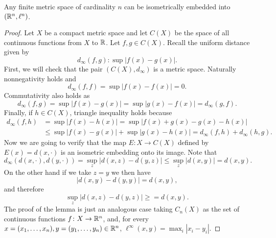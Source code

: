 \begin{lemma} \label{lemma:haus-aux-1}
    Any finite metric space of cardinality $ n $ can be isometrically embedded into $(\mathbb R^n, \ell^n)$.
\end{lemma}
\begin{proof}
    Let $ X $ be a compact metric space and let $ C(X) $ be the space of all continuous functions from $ X $ to $ \mathbb R $. Let $ f, g \in C(X) $. Recall the uniform distance given by
    \begin{equation}
        d_\infty(f, g) \colon \sup | f(x) - g(x) |.
    \end{equation}
    First, we will check that the pair $ (C(X), d_\infty) $ is a metric space. Naturally nonnegativity holds and 
    \begin{equation}
        d_\infty(f, f) = \sup | f(x) - f(x) | = 0.
    \end{equation}
    Commutativity also holds as 
    \begin{equation}
        d_\infty(f, g) = \sup | f(x) - g(x) | = \sup | g(x) - f(x) | = d_\infty(g, f).
    \end{equation}
    Finally, if $ h \in C(X) $, triangle inequality holds because
    \begin{align}
        d_\infty(f, h) &= \sup | f(x) - h(x) | = \sup | f(x) + g(x) - g(x) - h(x) | \\
        &\leq \sup | f(x)- g(x) | + \sup | g(x) - h(x) | = d_\infty(f, h) + d_\infty(h, g).
    \end{align}
    Now we are going to verify that the map $ E \colon X \to C(X) $ defined by $ E(x) = d(x, \cdot) $ is an isometric embedding onto its image. Note that
    \begin{equation}
        d_\infty(d(x, \cdot), d(y, \cdot)) = \sup_z |d(x, z) - d(y, z)| \leq  \sup_z |d(x, y)| = d(x, y).
    \end{equation}
    On the other hand if we take $ z = y $ we then have
    \begin{equation}
        |d(x, y) - d(y, y)| = d(x, y),
    \end{equation}
    and therefore
    \begin{equation}
        \sup_z |d(x, z) - d(y, z)| \geq = d(x, y).
    \end{equation}
    The proof of the lemma is just an analogous case taking $ C_n(X) $ as the set of continuous functions $ f \colon X \to \mathbb R^n $, and, for every $ x = (x_1, \dots, x_n), y = (y_1, \dots, y_n) \in \mathbb R^n $, $ \ell^\infty(x, y) = \max_i |x_i - y_i|$.
\end{proof}

